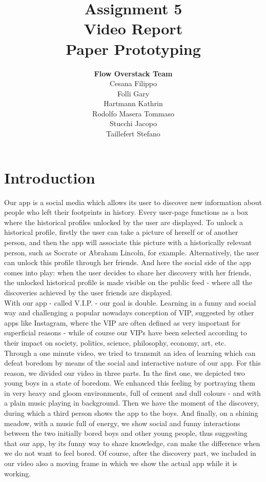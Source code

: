 \documentclass[12pt]{scrartcl}
\title{Assignment 5\\ Video Report\\ Paper Prototyping}
\author{\textbf{Flow Overstack Team}\\ Cesana Filippo\\ Folli Gary\\ Hartmann Kathrin\\ Rodolfo Masera Tommaso\\ Stucchi Jacopo\\ Taillefert Stefano}
\date{}
\begin{document}
\maketitle

\tableofcontents

\newpage

\section{Introduction}

	
	Our app is a social media which allows its user to discover new information about people who left their footprints in history. Every user-page functions as a box where the historical profiles unlocked by the user are displayed. To unlock a historical profile, firstly the user can take a picture of herself or of another person, and then the app will associate this picture with a historically relevant person, such as Socrate or Abraham Lincoln, for example. Alternatively, the user can unlock this profile through her friends. And here the social side of the app comes into play: when the user decides to share her discovery with her friends, the unlocked historical profile is made visible on the public feed - where all the discoveries achieved by the user friends are displayed.\\
	
	With our app - called V.I.P. - our goal is double. Learning in a funny and social way and challenging a popular nowadays conception of VIP, suggested by other apps like Instagram, where the VIP are often defined as very important for superficial reasons - while of course our VIPs have been selected according to their impact on society, politics, science, philosophy, economy, art, etc.\\
	
	Through a one minute video, we tried to transmit an idea of learning which can defeat boredom by means of the social and interactive nature of our app. For this reason, we divided our video in three parts. In the first one, we depicted two young boys in a state of boredom. We enhanced this feeling by portraying them in very heavy and gloom environments, full of cement and dull colours - and with a plain music playing in background. Then we have the moment of the discovery, during which a third person shows the app to the boys. And finally, on a shining meadow, with a music full of energy, we show social and funny interactions between the two initially bored boys and other young people, thus suggesting that our app, by its funny way to share knowledge, can make the difference when we do not want to feel bored. Of course, after the discovery part, we included in our video also a moving frame in which we show the actual app while it is working.\\
	
\end{document}
